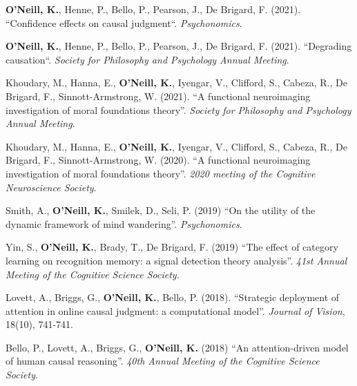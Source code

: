 \textbf{O'Neill, K.}, Henne, P., Bello, P., Pearson, J., De Brigard,
F. (2021). ``Confidence effects on causal
judgment``. \emph{Psychonomics}.

\textbf{O'Neill, K.}, Henne, P., Bello, P., Pearson, J., De Brigard,
F. (2021). ``Degrading causation``. \emph{Society for Philosophy and
Psychology Annual Meeting}.

Khoudary, M., Hanna, E., \textbf{O’Neill, K.}, Iyengar, V., Clifford,
S., Cabeza, R., De Brigard, F., Sinnott-Armstrong, W. (2021). ``A
functional neuroimaging investigation of moral foundations
theory''. \emph{Society for Philosophy and Psychology Annual Meeting}.

Khoudary, M., Hanna, E., \textbf{O’Neill, K.}, Iyengar, V., Clifford,
S., Cabeza, R., De Brigard, F., Sinnott-Armstrong, W. (2020). ``A
functional neuroimaging investigation of moral foundations
theory''. \emph{2020 meeting of the Cognitive Neuroscience Society}.

Smith, A., \textbf{O'Neill, K.}, Smilek, D., Seli, P. (2019) ``On the
utility of the dynamic framework of mind
wandering''. \emph{Psychonomics}.

Yin, S., \textbf{O'Neill, K.}, Brady, T., De Brigard, F. (2019) ``The
effect of category learning on recognition memory: a signal detection
theory analysis''. \emph{41st Annual Meeting of the Cognitive Science
Society}.

Lovett, A., Briggs, G., \textbf{O'Neill, K.}, Bello,
P. (2018). ``Strategic deployment of attention in online causal
judgment: a computational model''. \emph{Journal of Vision}, 18(10),
741-741.

Bello, P., Lovett, A., Briggs, G., \textbf{O'Neill, K.} (2018) ``An
attention-driven model of human causal reasoning''. \emph{40th Annual
Meeting of the Cognitive Science Society}.
